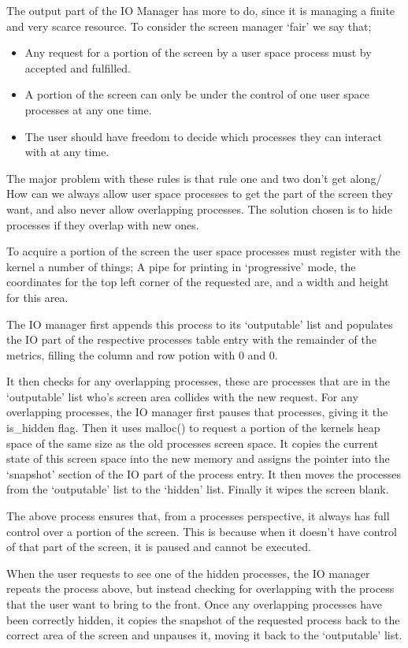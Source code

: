\documentclass[a4paper]{report}
\begin{document}
The output part of the IO Manager has more to do, since it is managing a finite and very scarce resource. To consider the screen manager `fair' we say that; 
\begin{itemize}
\item Any request for a portion of the screen by a user space process must by accepted and fulfilled.
\item A portion of the screen can only be under the control of one user space processes at any one time.
\item The user should have freedom to decide which processes they can interact with at any time.
\end{itemize}

The major problem with these rules is that rule one and two don't get along/ How can we always allow user space processes to get the part of the screen they want, and also never allow overlapping processes. The solution chosen is to hide processes if they overlap with new ones.

To acquire a portion of the screen the user space processes must register with the kernel a number of things; A pipe for printing in `progressive' mode, the coordinates for the top left corner of the requested are, and a width and height for this area.

The IO manager first appends this process to its `outputable' list and populates the IO part of the respective processes table entry with the remainder of the metrics, filling the column and row potion with 0 and 0.

It then checks for any overlapping processes, these are processes that are in the `outputable' list who's screen area collides with the new request. For any overlapping processes, the IO manager first pauses that processes, giving it the is\_hidden flag. Then it uses malloc() to request a portion of the kernels heap space of the same size as the old processes screen space. It copies the current state of this screen space into the new memory and assigns the pointer into the `snapshot' section of the IO part of the process entry. It then moves the processes from the `outputable' list to the `hidden' list. Finally it wipes the screen blank.

The above process ensures that, from a processes perspective, it always has full control over a portion of the screen. This is because when it doesn't have control of that part of the screen, it is paused and cannot be executed.

When the user requests to see one of the hidden processes, the IO manager repeats the process above, but instead checking for overlapping with the process that the user want to bring to the front. Once any overlapping processes have been correctly hidden, it copies the snapshot of the requested process back to the correct area of the screen and unpauses it, moving it back to the `outputable' list.
\end{document}
